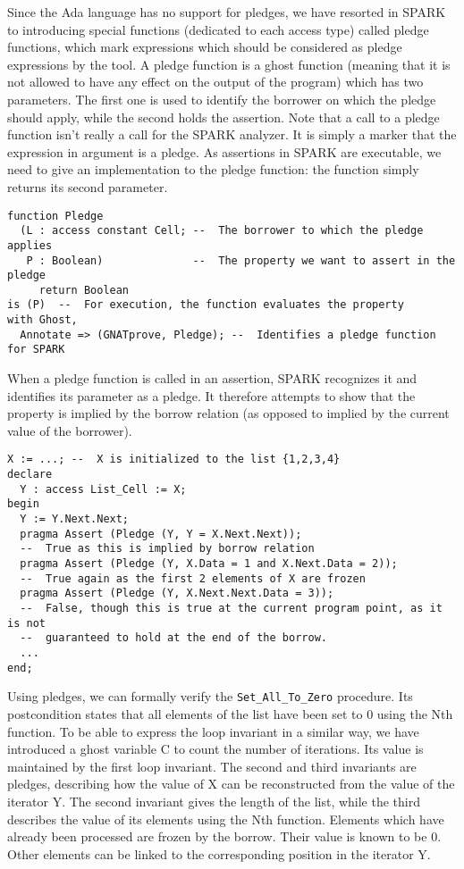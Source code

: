 \documentclass[runningheads]{llncs}
\begin{document}
Since the Ada language has no support for pledges, we have resorted in SPARK to introducing special functions (dedicated to each access type) called pledge functions, which mark expressions which should be considered as pledge expressions by the tool. A pledge function is a ghost function (meaning that it is not allowed to have any effect on the output of the program) which has two parameters. The first one is used to identify the borrower on which the pledge should apply, while the second holds the assertion.
Note that a call to a pledge function isn't really a call for the SPARK analyzer. It is simply a marker that the expression in argument is a pledge. As assertions in SPARK are executable, we need to give an implementation to the pledge function: the function simply returns its second parameter.
\begin{lstlisting}
function Pledge
  (L : access constant Cell; --  The borrower to which the pledge applies
   P : Boolean)              --  The property we want to assert in the pledge
     return Boolean
is (P)  --  For execution, the function evaluates the property
with Ghost,
  Annotate => (GNATprove, Pledge); --  Identifies a pledge function for SPARK
\end{lstlisting}
When a pledge function is called in an assertion, SPARK recognizes it and identifies its parameter as a pledge. It therefore attempts to show that the property is implied by the borrow relation (as opposed to implied by the current value of the borrower).
\begin{lstlisting}
X := ...; --  X is initialized to the list {1,2,3,4}
declare
  Y : access List_Cell := X;
begin
  Y := Y.Next.Next;
  pragma Assert (Pledge (Y, Y = X.Next.Next));
  --  True as this is implied by borrow relation
  pragma Assert (Pledge (Y, X.Data = 1 and X.Next.Data = 2));
  --  True again as the first 2 elements of X are frozen
  pragma Assert (Pledge (Y, X.Next.Next.Data = 3));
  --  False, though this is true at the current program point, as it is not
  --  guaranteed to hold at the end of the borrow.
  ...
end;
\end{lstlisting}
Using pledges, we can formally verify the \texttt{Set\_All\_To\_Zero} procedure. Its postcondition states that all elements of the list have been set to 0 using the Nth function. To be able to express the loop invariant in a similar way, we have introduced a ghost variable C to count the number of iterations. Its value is maintained by the first loop invariant. The second and third invariants are pledges, describing how the value of X can be reconstructed from the value of the iterator Y. The second invariant gives the length of the list, while the third describes the value of its elements using the Nth function. Elements which have already been processed are frozen by the borrow. Their value is known to be 0. Other elements can be linked to the corresponding position in the iterator Y.
\end{document}
